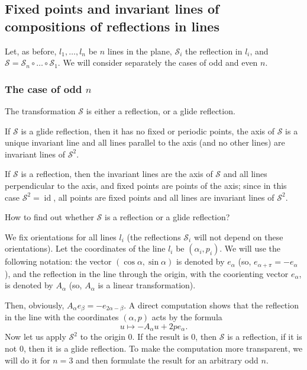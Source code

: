 \documentclass[12pt]{article}
\newcommand{\id}{\operatorname{id}}
\begin{document}
\subsection{Fixed points and invariant lines of compositions of reflections in lines}\label{fixed_points}

Let, as before, $l_1,\dots,l_n$ be $n$ lines in the plane, ${\mathcal S}_i$ the reflection in $l_i$, and $\mathcal S={\mathcal S}_n\circ\ldots\circ{\mathcal S}_1$. We will consider separately the cases of odd and even $n$.

\subsubsection{The case of odd $n$}\label{oddn} The transformation $\mathcal S$ is either a reflection, or a glide reflection. 

If $\mathcal S$ is a glide reflection, then it has no fixed or periodic points, the axis of $\mathcal S$ is a unique invariant line and all lines parallel to the axis (and no other lines) are invariant lines of ${\mathcal S}^2$. 

If $\mathcal S$ is a reflection, then the invariant lines are the axis of $\mathcal S$ and all lines perpendicular to the axis, and fixed points are points of the axis; since in this case ${\mathcal S}^2=\id$, all points are fixed points and all lines are invariant lines of ${\mathcal S}^2$. 

How to find out whether $\mathcal S$ is a reflection or a glide reflection?

We fix orientations for all lines $l_i$ (the reflections ${\mathcal S}_i$ will not depend on these orientations). Let the coordinates of the line $l_i$ be $(\alpha_i,p_i)$. We will use the following notation: the vector $(\cos\alpha,\sin\alpha)$ is denoted by $e_\alpha$ (so, $e_{\alpha+\pi}=-e_\alpha$), and the reflection in the line through the origin, with the coorienting vector $e_\alpha$, is denoted by $A_\alpha$ (so, $A_\alpha$ is a linear transformation). 

Then, obviously, $A_\alpha e_\beta=-e_{2\alpha-\beta}$. A direct computation shows that the reflection in the line with the coordinates $(\alpha,p)$ acts by the formula $$u\mapsto -A_\alpha u+2pe_\alpha.$$Now let us apply ${\mathcal S}^2$ to the origin 0. If the result is 0, then $\mathcal S$ is a reflection, if it is not 0, then it is a glide reflection. To make the computation more transparent, we will do it for $n=3$ and then formulate the result for an arbitrary odd $n$.
\end{document}

